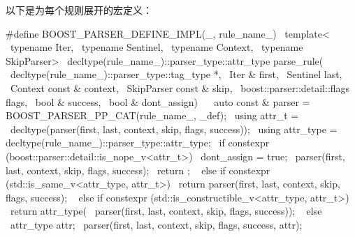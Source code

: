 以下是为每个规则展开的宏定义：
\begin{code}
#define BOOST_PARSER_DEFINE_IMPL(_, rule_name_)                                \
    template<                                                                  \
        typename Iter,                                                         \
        typename Sentinel,                                                     \
        typename Context,                                                      \
        typename SkipParser>                                                   \
    decltype(rule_name_)::parser_type::attr_type parse_rule(                   \
        decltype(rule_name_)::parser_type::tag_type *,                         \
        Iter & first,                                                          \
        Sentinel last,                                                         \
        Context const & context,                                               \
        SkipParser const & skip,                                               \
        boost::parser::detail::flags flags,                                    \
        bool & success,                                                        \
        bool & dont_assign)                                                    \
    {                                                                          \
        auto const & parser = BOOST_PARSER_PP_CAT(rule_name_, _def);           \
        using attr_t =                                                         \
            decltype(parser(first, last, context, skip, flags, success));      \
        using attr_type = decltype(rule_name_)::parser_type::attr_type;        \
        if constexpr (boost::parser::detail::is_nope_v<attr_t>) {              \
            dont_assign = true;                                                \
            parser(first, last, context, skip, flags, success);                \
            return {};                                                         \
        } else if constexpr (std::is_same_v<attr_type, attr_t>) {              \
            return parser(first, last, context, skip, flags, success);         \
        } else if constexpr (std::is_constructible_v<attr_type, attr_t>) {     \
            return attr_type(                                                  \
                parser(first, last, context, skip, flags, success));           \
        } else {                                                               \
            attr_type attr{};                                                  \
            parser(first, last, context, skip, flags, success, attr);          \
}}
\end{code}
